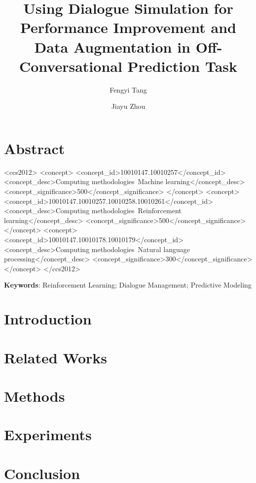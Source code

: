 

\title{Using Dialogue Simulation for Performance Improvement and Data Augmentation in Off-Conversational Prediction Task}

\author{Fengyi Tang}

\author{Jiayu Zhou}

\section{Abstract}


\begin{CCSXML}
<ccs2012>
<concept>
<concept_id>10010147.10010257</concept_id>
<concept_desc>Computing methodologies~Machine learning</concept_desc>
<concept_significance>500</concept_significance>
</concept>
<concept>
<concept_id>10010147.10010257.10010258.10010261</concept_id>
<concept_desc>Computing methodologies~Reinforcement learning</concept_desc>
<concept_significance>500</concept_significance>
</concept>
<concept>
<concept_id>10010147.10010178.10010179</concept_id>
<concept_desc>Computing methodologies~Natural language processing</concept_desc>
<concept_significance>300</concept_significance>
</concept>
</ccs2012>
\end{CCSXML}


\textbf{Keywords}: Reinforcement Learning; Dialogue Management; Predictive Modeling 

\maketitle

\section{Introduction}


\section{Related Works}


\section{Methods}


\section{Experiments}


\section{Conclusion}





